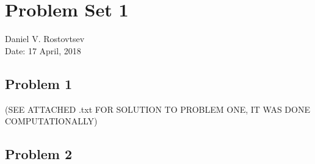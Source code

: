 \documentclass{article}
\begin{document}
\section*{Problem Set 1}
Daniel V. Rostovtsev
\\Date: 17 April, 2018



\subsection*{Problem 1}
(SEE ATTACHED .txt FOR SOLUTION TO PROBLEM ONE, IT WAS DONE COMPUTATIONALLY)



\subsection*{Problem 2}
\end{document}
